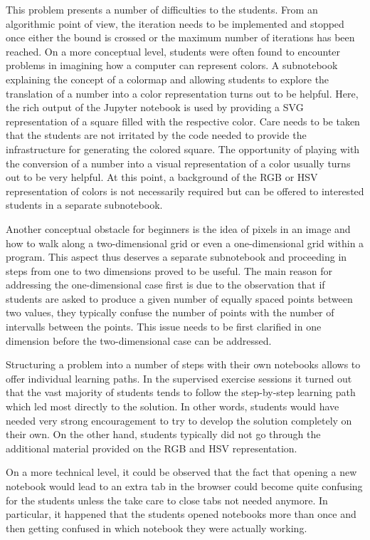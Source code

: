 \documentclass[twocolumn]{svjour3}          %
\begin{document}
This problem presents a number of difficulties to the students. From an
algorithmic point of view, the iteration needs to be implemented and stopped
once either the bound is crossed or the maximum number of iterations has been
reached. On a more conceptual level, students were often found to encounter
problems in imagining how a computer can represent colors. A subnotebook
explaining the concept of a colormap and allowing students to explore the
translation of a number into a color representation turns out to be helpful.
Here, the rich output of the Jupyter notebook is used by providing a SVG
representation of a square filled with the respective color. Care needs to
be taken that the students are not irritated by the code needed to provide
the infrastructure for generating the colored square. The opportunity of
playing with the conversion of a number into a visual representation of a
color usually turns out to be very helpful. At this point, a background of
the RGB or HSV representation of colors is not necessarily required but
can be offered to interested students in a separate subnotebook.

Another conceptual obstacle for beginners is the idea of pixels in an image
and how to walk along a two-dimensional grid or even a one-dimensional grid
within a program. This aspect thus deserves a separate subnotebook and proceeding
in steps from one to two dimensions proved to be useful. The main reason for
addressing the one-dimensional case first is due to the observation that if
students are asked to produce a given number of equally spaced points between
two values, they typically confuse the number of points with the number of
intervalls between the points. This issue needs to be first clarified in one
dimension before the two-dimensional case can be addressed.

Structuring a problem into a number of steps with their own notebooks allows to
offer individual learning paths. In the supervised exercise sessions it turned
out that the vast majority of students tends to follow the step-by-step
learning path which led most directly to the solution. In other words, students
would have needed very strong encouragement to try to develop the solution
completely on their own. On the other hand, students typically did not go through
the additional material provided on the RGB and HSV representation.

On a more technical level, it could be observed that the fact that opening a
new notebook would lead to an extra tab in the browser could become quite
confusing for the students unless the take care to close tabs not needed
anymore. In particular, it happened that the students opened notebooks more
than once and then getting confused in which notebook they were actually
working.
\end{document}

